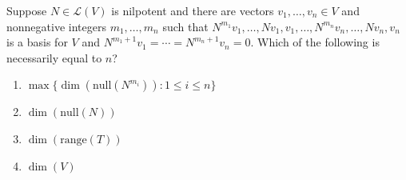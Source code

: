 \documentclass{article}
\begin{document}
\noindent
\begin{minipage}{0.65\linewidth}
Suppose $N \in \mathcal{L}(V)$ is nilpotent and there are vectors $v_1,\ldots,v_n \in V$ and nonnegative integers $m_1,\ldots,m_n$ such that
$N^{m_1}v_1,\ldots,Nv_1,v_1,\ldots,N^{m_n}v_n,\ldots,Nv_n,v_n$ is a basis for $V$ and
$N^{m_1+1}v_1=\cdots=N^{m_n+1}v_n=0$. Which of the following is necessarily equal to $n$?
\end{minipage}

\begin{enumerate}
  \item $\max\{\dim(\mathrm{null}(N^{m_i})) : 1 \le i \le n\}$
  \item $\dim(\mathrm{null}(N))$
  \item $\dim(\mathrm{range}(T))$
  \item $\dim(V)$
\end{enumerate}
\end{document}
